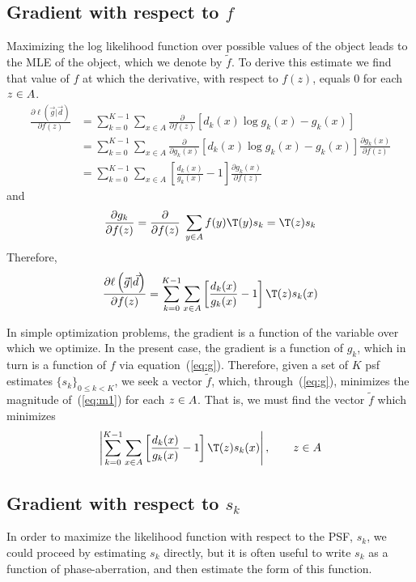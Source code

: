 \subsection{Gradient with respect to $f$}
Maximizing the log likelihood function over possible values of the
object leads to the MLE of the object, which we denote by $\tilde{f}$.
To derive this estimate we find that value of $f$ at which the derivative,
with respect to $f(z)$, equals 0 for each $z \in A$.
\begin{align*}
\frac{\partial \ell\left(\vec{g} |\vec{d}\right)}{\partial f(z)} 
&= \sum_{k=0}^{K-1} \sum_{x\in A} \frac{\partial}{\partial f(z)}\left[ d_k(x)\log g_k(x) - g_k(x)\right]\\
&= \sum_{k=0}^{K-1} \sum_{x\in A} \frac{\partial}{\partial g_k(x)}\left[ d_k(x)\log g_k(x) - g_k(x)\right] \frac{\partial g_k(x)}{\partial f(z)}\\
&= \sum_{k=0}^{K-1} \sum_{x\in A} \left[ \frac{ d_k(x)}{g_k(x)} - 1\right]\frac{\partial g_k(x)}{\partial f(z)} 
\end{align*}
and
\[%
\frac{\partial g_k}{\partial f(z)} = \frac{\partial}{\partial f(z)} \;\sum_{y \in \groupA} f(y)\T(y)s_k
= \T(z)s_k\]
Therefore, 
\begin{equation}\label{eq:m1}
\frac{\partial \ell\left(\vec{g} |\vec{d}\right)}{\partial f(z)} 
= \sum_{k=0}^{K-1} \sum_{x\in A} \left[ \frac{ d_k(x)}{g_k(x)} - 1\right] \T(z)s_k(x)
\end{equation}

In simple optimization problems, the gradient is a
function of the variable over which we optimize.  In the present
case, the gradient is a function of $g_k$, which in turn is a function of $f$ via
equation~(\ref{eq:g}).  Therefore, given a set of $K$ psf
estimates $\{s_k\}_{0\leq k < K}$, we seek a vector $\tilde{f}$, %
which, through~(\ref{eq:g}), minimizes the magnitude of~(\ref{eq:m1}) for each
$z \in A$.  That is, we must find the vector $\tilde{f}$ which minimizes
\[
\left|
\sum_{k=0}^{K-1} \sum_{x\in A} \left[ \frac{ d_k(x)}{g_k(x)} - 1\right]\T(z) s_k(x)
\right|, \qquad z \in \groupA
\]

\subsection{Gradient with respect to $s_k$}
In order to maximize the likelihood function with respect to the PSF, $s_k$, we
could proceed by estimating $s_k$ directly, but it is often useful to 
write $s_k$ as a function of phase-aberration, and then estimate the form of
this function.
